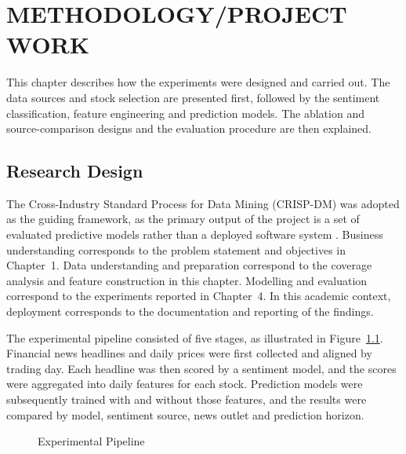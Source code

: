 \chapter{METHODOLOGY/PROJECT WORK}

This chapter describes how the experiments were designed and carried out. The data sources and stock selection are presented first, followed by the sentiment classification, feature engineering and prediction models. The ablation and source-comparison designs and the evaluation procedure are then explained.

\section{Research Design}
\label{sec:research-design}
The Cross-Industry Standard Process for Data Mining (CRISP-DM) was adopted as the guiding framework, as the primary output of the project is a set of evaluated predictive models rather than a deployed software system \parencite{wirth2000crisp}. Business understanding corresponds to the problem statement and objectives in Chapter~1. Data understanding and preparation correspond to the coverage analysis and feature construction in this chapter. Modelling and evaluation correspond to the experiments reported in Chapter~4. In this academic context, deployment corresponds to the documentation and reporting of the findings.

The experimental pipeline consisted of five stages, as illustrated in Figure~\ref{fig:pipeline}. Financial news headlines and daily prices were first collected and aligned by trading day. Each headline was then scored by a sentiment model, and the scores were aggregated into daily features for each stock. Prediction models were subsequently trained with and without those features, and the results were compared by model, sentiment source, news outlet and prediction horizon.

\begin{figure}[htbp]
\centering
{}
\caption{Experimental Pipeline}
\label{fig:pipeline}
\end{figure}

